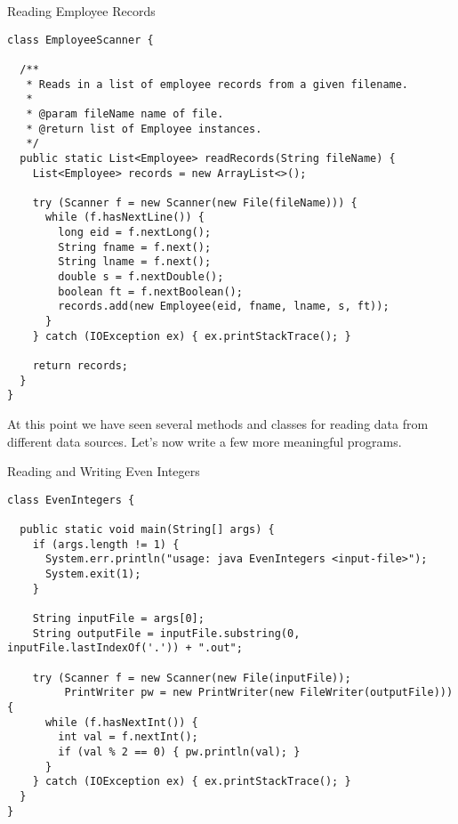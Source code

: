 \begin{cl}{Reading Employee Records}
\begin{lstlisting}[language=MyJava]
class EmployeeScanner {

  /**
   * Reads in a list of employee records from a given filename.
   *
   * @param fileName name of file.
   * @return list of Employee instances.
   */
  public static List<Employee> readRecords(String fileName) {
    List<Employee> records = new ArrayList<>();

    try (Scanner f = new Scanner(new File(fileName))) {
      while (f.hasNextLine()) {
        long eid = f.nextLong();
        String fname = f.next();
        String lname = f.next();
        double s = f.nextDouble();
        boolean ft = f.nextBoolean();
        records.add(new Employee(eid, fname, lname, s, ft));
      }
    } catch (IOException ex) { ex.printStackTrace(); }

    return records;
  }
}
\end{lstlisting}
\end{cl}

At this point we have seen several methods and classes for reading data from different data sources. Let's now write a few more meaningful programs.


\begin{cl}{Reading and Writing Even Integers}
\begin{lstlisting}[language=MyJava]
class EvenIntegers {

  public static void main(String[] args) {
    if (args.length != 1) {
      System.err.println("usage: java EvenIntegers <input-file>");
      System.exit(1);
    }

    String inputFile = args[0];
    String outputFile = inputFile.substring(0, inputFile.lastIndexOf('.')) + ".out";

    try (Scanner f = new Scanner(new File(inputFile));
         PrintWriter pw = new PrintWriter(new FileWriter(outputFile))) {
      while (f.hasNextInt()) {
        int val = f.nextInt();
        if (val % 2 == 0) { pw.println(val); }
      }
    } catch (IOException ex) { ex.printStackTrace(); }
  }
}
\end{lstlisting}
\end{cl}

